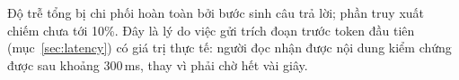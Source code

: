 Độ trễ tổng bị chi phối hoàn toàn bởi bước sinh câu trả lời; phần truy xuất chiếm chưa tới
10\%. Đây là lý do việc gửi trích đoạn trước token đầu tiên (mục~\ref{sec:latency}) có giá trị
thực tế: người đọc nhận được nội dung kiểm chứng được sau khoảng 300\,ms, thay vì phải chờ hết
vài giây.

\chapterbreak

